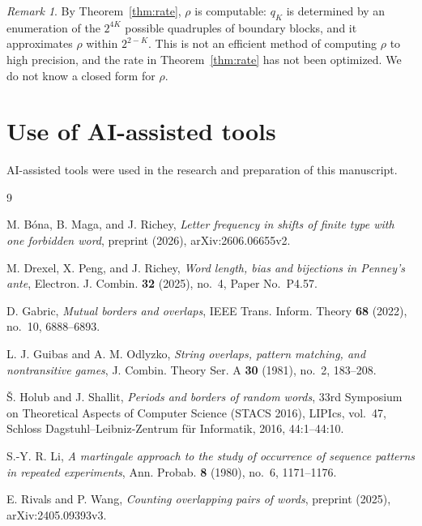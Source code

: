 \documentclass[11pt]{amsart}
\theoremstyle{remark}
\newtheorem{remark}[theorem]{Remark}
\numberwithin{equation}{section}
\begin{document}
\begin{remark}
By Theorem~\ref{thm:rate}, $\rho$ is computable: $q_K$ is determined by an enumeration of the $2^{4K}$ possible quadruples of boundary blocks, and it approximates $\rho$ within $2^{2-K}$. This is not an efficient method of computing $\rho$ to high precision, and the rate in Theorem~\ref{thm:rate} has not been optimized. We do not know a closed form for $\rho$.
\end{remark}

\section*{Use of AI-assisted tools}

AI-assisted tools were used in the research and preparation of this manuscript.

\begin{thebibliography}{9}

M. Bóna, B. Maga, and J. Richey, \emph{Letter frequency in shifts of finite type with one forbidden word}, preprint (2026), arXiv:2606.06655v2.

M. Drexel, X. Peng, and J. Richey, \emph{Word length, bias and bijections in Penney's ante}, Electron. J. Combin. \textbf{32} (2025), no.~4, Paper No.~P4.57.

D. Gabric, \emph{Mutual borders and overlaps}, IEEE Trans. Inform. Theory \textbf{68} (2022), no.~10, 6888--6893.

L. J. Guibas and A. M. Odlyzko, \emph{String overlaps, pattern matching, and nontransitive games}, J. Combin. Theory Ser. A \textbf{30} (1981), no.~2, 183--208.

Š. Holub and J. Shallit, \emph{Periods and borders of random words}, 33rd Symposium on Theoretical Aspects of Computer Science (STACS 2016), LIPIcs, vol.~47, Schloss Dagstuhl--Leibniz-Zentrum für Informatik, 2016, 44:1--44:10.

S.-Y. R. Li, \emph{A martingale approach to the study of occurrence of sequence patterns in repeated experiments}, Ann. Probab. \textbf{8} (1980), no.~6, 1171--1176.

E. Rivals and P. Wang, \emph{Counting overlapping pairs of words}, preprint (2025), arXiv:2405.09393v3.

\end{thebibliography}
\end{document}

